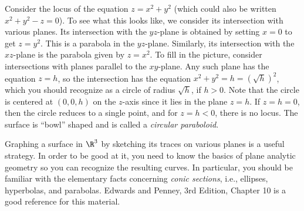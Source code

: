 \begin{example}
	Consider the locus of the equation $z = x^2 + y^2$ (which could
	also be written $x^2 + y^2 - z = 0$).  To see what this looks like,
	we consider its intersection with various planes.   Its intersection
	with the $yz$-plane is obtained by setting $x = 0$ to get
	$z = y^2$.  This is a parabola in the $yz$-plane.  
	Similarly, its intersection with the $xz$-plane is the parabola
	given by $z = x^2$.   To fill in the picture,  consider
	intersections with planes parallel to the $xy$-plane.  Any
	such plane has the equation $z = h$, so the intersection has the equation
	$x^2 + y^2 = h = (\sqrt h)^2$, which you should recognize as a circle
	of radius $\sqrt h$, if $h > 0$.  Note that the circle is
	centered at $(0,0,h)$ on the $z$-axis since it lies in the plane $z = h$.
	If $z = h = 0$, then the circle reduces to a single point, and for 
	$z = h < 0$, there is no locus.
	The surface is ``bowl'' shaped and is called a \emph{circular
	paraboloid}.

	\begin{center}
	\end{center}
\end{example}

Graphing a surface in $\R^3$ by sketching its traces on various
planes is a useful strategy.  In order to be good at it, you need
to know the basics of plane analytic geometry so you can recognize
the resulting curves.  In particular, you should be familiar with
the elementary facts concerning \emph{conic sections}, i.e.,
ellipses, hyperbolas, and parabolas.   Edwards and Penney, 3rd Edition,
Chapter 10 is a good reference for this material.

